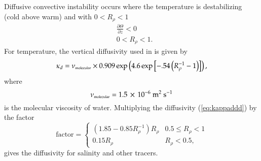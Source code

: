 Diffusive convective instability occurs where the temperature is
destabilizing (cold above warm) and with $0 < R_{\rho} < 1$
\begin{align}
  &\frac{\partial \Theta}{\partial z} < 0 
 \\
  &0 < R_{\rho} < 1.
\end{align}
For temperature, the vertical diffusivity used in \cite{LargeKPP} is
given by
\begin{eqnarray}
\kappa_d = \nu_{\mbox{\tiny molecular}} \times 0.909
     \exp\left(4.6\exp\left[-.54\left(R_{\rho}^{-1} - 1\right)\right]\right),
\label{eq:kappaddd}
\end{eqnarray}
where 
\begin{equation}
  \nu_{\mbox{\tiny molecular}} = 1.5 \, \times \, 10^{-6}~\mbox{m}^{2}~\mbox{s}^{-1}
\end{equation}
is the molecular viscosity of water.  Multiplying the diffusivity
(\ref{eq:kappaddd}) by the factor
\begin{equation}
\mathrm{factor} = 
\begin{cases}
\left(1.85 - 0.85R_{\rho}^{-1}\right) R_{\rho} & 0.5\leq R_{\rho}<1 \\
0.15  R_{\rho}                                 & R_{\rho} < 0.5, 
\end{cases}
\label{schmitdd}
\end{equation}
gives the diffusivity for salinity and other tracers.

